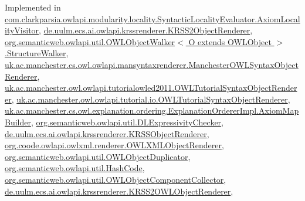 Implemented in \hyperlink{classcom_1_1clarkparsia_1_1owlapi_1_1modularity_1_1locality_1_1_syntactic_locality_evaluator_1_1_axiom_locality_visitor_a36e740de622b6b8768f2647f91da15e6}{com.\-clarkparsia.\-owlapi.\-modularity.\-locality.\-Syntactic\-Locality\-Evaluator.\-Axiom\-Locality\-Visitor}, \hyperlink{classde_1_1uulm_1_1ecs_1_1ai_1_1owlapi_1_1krssrenderer_1_1_k_r_s_s2_object_renderer_a8b47769f2064986c72b5fe320db2b35c}{de.\-uulm.\-ecs.\-ai.\-owlapi.\-krssrenderer.\-K\-R\-S\-S2\-Object\-Renderer}, \hyperlink{classorg_1_1semanticweb_1_1owlapi_1_1util_1_1_o_w_l_object_walker_3_01_o_01extends_01_o_w_l_object_01_4_1_1_structure_walker_acb127cd96fcf17c184cff0db1a78ded9}{org.\-semanticweb.\-owlapi.\-util.\-O\-W\-L\-Object\-Walker$<$ O extends O\-W\-L\-Object $>$.\-Structure\-Walker}, \hyperlink{classuk_1_1ac_1_1manchester_1_1cs_1_1owl_1_1owlapi_1_1mansyntaxrenderer_1_1_manchester_o_w_l_syntax_object_renderer_a2a9b28cd4c2ae0df651d1e4c3cfd80db}{uk.\-ac.\-manchester.\-cs.\-owl.\-owlapi.\-mansyntaxrenderer.\-Manchester\-O\-W\-L\-Syntax\-Object\-Renderer}, \hyperlink{classuk_1_1ac_1_1manchester_1_1owl_1_1owlapi_1_1tutorialowled2011_1_1_o_w_l_tutorial_syntax_object_renderer_a1d93d4ddba5f33c74ef8b34f4a4b6444}{uk.\-ac.\-manchester.\-owl.\-owlapi.\-tutorialowled2011.\-O\-W\-L\-Tutorial\-Syntax\-Object\-Renderer}, \hyperlink{classuk_1_1ac_1_1manchester_1_1owl_1_1owlapi_1_1tutorial_1_1io_1_1_o_w_l_tutorial_syntax_object_renderer_aad668a82edc703417f2a7f617ff3475e}{uk.\-ac.\-manchester.\-owl.\-owlapi.\-tutorial.\-io.\-O\-W\-L\-Tutorial\-Syntax\-Object\-Renderer}, \hyperlink{classuk_1_1ac_1_1manchester_1_1cs_1_1owl_1_1explanation_1_1ordering_1_1_explanation_orderer_impl_1_1_axiom_map_builder_a45584607ebf6a9d820fbf2c8e2b8b08f}{uk.\-ac.\-manchester.\-cs.\-owl.\-explanation.\-ordering.\-Explanation\-Orderer\-Impl.\-Axiom\-Map\-Builder}, \hyperlink{classorg_1_1semanticweb_1_1owlapi_1_1util_1_1_d_l_expressivity_checker_a2fe9ad73e570b231214acc1e16b09664}{org.\-semanticweb.\-owlapi.\-util.\-D\-L\-Expressivity\-Checker}, \hyperlink{classde_1_1uulm_1_1ecs_1_1ai_1_1owlapi_1_1krssrenderer_1_1_k_r_s_s_object_renderer_a799e1fc5b99fdd90fb7037933a1676ef}{de.\-uulm.\-ecs.\-ai.\-owlapi.\-krssrenderer.\-K\-R\-S\-S\-Object\-Renderer}, \hyperlink{classorg_1_1coode_1_1owlapi_1_1owlxml_1_1renderer_1_1_o_w_l_x_m_l_object_renderer_a4310bb6baf50654651da5267cf202642}{org.\-coode.\-owlapi.\-owlxml.\-renderer.\-O\-W\-L\-X\-M\-L\-Object\-Renderer}, \hyperlink{classorg_1_1semanticweb_1_1owlapi_1_1util_1_1_o_w_l_object_duplicator_a2b8ec9da2f33e0e930910458ed51fafb}{org.\-semanticweb.\-owlapi.\-util.\-O\-W\-L\-Object\-Duplicator}, \hyperlink{classorg_1_1semanticweb_1_1owlapi_1_1util_1_1_hash_code_a8ca5bce8f56fe2ca85f4e41f85b27474}{org.\-semanticweb.\-owlapi.\-util.\-Hash\-Code}, \hyperlink{classorg_1_1semanticweb_1_1owlapi_1_1util_1_1_o_w_l_object_component_collector_a338cbdc6abd534150870b9dcb74b857d}{org.\-semanticweb.\-owlapi.\-util.\-O\-W\-L\-Object\-Component\-Collector}, \hyperlink{classde_1_1uulm_1_1ecs_1_1ai_1_1owlapi_1_1krssrenderer_1_1_k_r_s_s2_o_w_l_object_renderer_a67264efb5161e84204e2dd4ff4b284d4}{de.\-uulm.\-ecs.\-ai.\-owlapi.\-krssrenderer.\-K\-R\-S\-S2\-O\-W\-L\-Object\-Renderer}, 